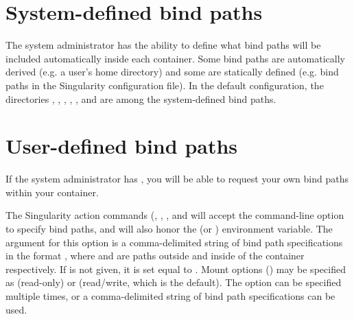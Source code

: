 \documentclass[letterpaper,10pt,english]{sphinxmanual}
\begin{document}
\section{System-defined bind paths}
\label{\detokenize{bind_paths_and_mounts:system-defined-bind-paths}}
The system administrator has the ability to define what bind paths will be
included automatically inside each container. Some bind paths are automatically
derived (e.g. a user’s home directory) and some are statically defined (e.g.
bind paths in the Singularity configuration file). In the default
configuration, the directories  ,  ,  ,  ,
, and  are among the system-defined bind paths.


\section{User-defined bind paths}
\label{\detokenize{bind_paths_and_mounts:user-defined-bind-paths}}
If the system administrator has ,
you will be able to request your own bind paths within your container.

The Singularity action commands (, , , and
 will accept the  command-line option to specify
bind paths, and will also honor the  (or
) environment variable. The argument for this option is
a comma-delimited string of bind path specifications in the format
, where  and  are paths outside and inside
of the container respectively. If  is not given, it is set equal to
. Mount options () may be specified as  (read-only) or
 (read/write, which is the default). The  option can be
specified multiple times, or a comma-delimited string of bind path
specifications can be used.
\end{document}
